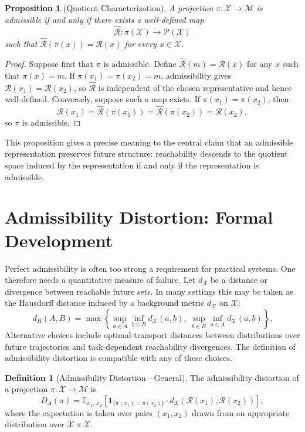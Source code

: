 \documentclass[12pt,a4paper]{article}
\theoremstyle{plain}
\newtheorem{proposition}{Proposition}
\theoremstyle{definition}
\newtheorem{definition}{Definition}
\theoremstyle{remark}
\begin{document}
\begin{proposition}[Quotient Characterization]
A projection $\pi : \mathcal{X} \to \mathcal{M}$ is admissible if and only if
there exists a well-defined map
\[
  \widehat{\mathcal{R}} : \pi(\mathcal{X}) \to \mathcal{P}(\mathcal{X})
\]
such that $\widehat{\mathcal{R}}(\pi(x)) = \mathcal{R}(x)$ for every
$x \in \mathcal{X}$.
\end{proposition}

\begin{proof}
Suppose first that $\pi$ is admissible. Define
$\widehat{\mathcal{R}}(m) = \mathcal{R}(x)$ for any $x$ such that
$\pi(x) = m$. If $\pi(x_1) = \pi(x_2) = m$, admissibility gives
$\mathcal{R}(x_1) = \mathcal{R}(x_2)$, so $\widehat{\mathcal{R}}$ is
independent of the chosen representative and hence well-defined. Conversely,
suppose such a map exists. If $\pi(x_1) = \pi(x_2)$, then
\[
  \mathcal{R}(x_1)
  = \widehat{\mathcal{R}}(\pi(x_1))
  = \widehat{\mathcal{R}}(\pi(x_2))
  = \mathcal{R}(x_2),
\]
so $\pi$ is admissible.
\end{proof}

This proposition gives a precise meaning to the central claim that an
admissible representation preserves future structure: reachability descends
to the quotient space induced by the representation if and only if the
representation is admissible.

\section{Admissibility Distortion: Formal Development}

Perfect admissibility is often too strong a requirement for practical systems.
One therefore needs a quantitative measure of failure. Let $d_{\mathcal{R}}$
be a distance or divergence between reachable future sets. In many settings
this may be taken as the Hausdorff distance induced by a background metric
$d_{\mathcal{X}}$ on $\mathcal{X}$:
\[
  d_H(A, B)
  =
  \max
  \!\left\{
    \sup_{a \in A} \inf_{b \in B} d_{\mathcal{X}}(a, b),\;
    \sup_{b \in B} \inf_{a \in A} d_{\mathcal{X}}(a, b)
  \right\}.
\]
Alternative choices include optimal-transport distances between distributions
over future trajectories and task-dependent reachability divergences. The
definition of admissibility distortion is compatible with any of these choices.

\begin{definition}[Admissibility Distortion---General]
The admissibility distortion of a projection $\pi : \mathcal{X} \to \mathcal{M}$
is
\[
  D_A(\pi)
  =
  \mathbb{E}_{x_1,\,x_2}
  \!\left[
    \mathbf{1}_{\{\pi(x_1) = \pi(x_2)\}}
    \cdot
    d_{\mathcal{R}}\!\left(\mathcal{R}(x_1), \mathcal{R}(x_2)\right)
  \right],
\]
where the expectation is taken over pairs $(x_1, x_2)$ drawn from an
appropriate distribution over $\mathcal{X} \times \mathcal{X}$.
\end{definition}
\end{document}
